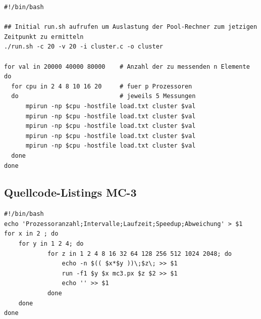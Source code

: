 \documentclass[a4paper,12pt]{scrartcl}
\begin{document}
\begin{lstlisting}[captionpos=b, caption=MPI BASH-Script: bench.sh, label=mpibenchsh]
#!/bin/bash

## Initial run.sh aufrufen um Auslastung der Pool-Rechner zum jetzigen Zeitpunkt zu ermitteln
./run.sh -c 20 -v 20 -i cluster.c -o cluster

for val in 20000 40000 80000	# Anzahl der zu messenden n Elemente
do
  for cpu in 2 4 8 10 16 20		# fuer p Prozessoren
  do							# jeweils 5 Messungen
	  mpirun -np $cpu -hostfile load.txt cluster $val
	  mpirun -np $cpu -hostfile load.txt cluster $val
	  mpirun -np $cpu -hostfile load.txt cluster $val
	  mpirun -np $cpu -hostfile load.txt cluster $val
	  mpirun -np $cpu -hostfile load.txt cluster $val
  done
done
\end{lstlisting}


\subsection{Quellcode-Listings MC-3}
\label{mc3:erfassungsh}
\begin{lstlisting}[captionpos=b, caption=MC-3 BASH-Script: erfassung.sh, label=mc3erfassungsh]
#!/bin/bash
echo 'Prozessoranzahl;Intervalle;Laufzeit;Speedup;Abweichung' > $1
for x in 2 ; do
	for y in 1 2 4; do
			for z in 1 2 4 8 16 32 64 128 256 512 1024 2048; do
				echo -n $(( $x*$y ))\;$z\; >> $1
				run -f1 $y $x mc3.px $z $2 >> $1
				echo '' >> $1
			done
	done
done
\end{lstlisting}
\end{document}
